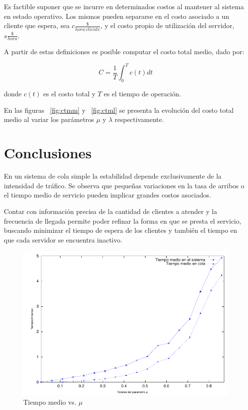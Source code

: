 \documentclass{sig-alternate}
\begin{document}
Es factible suponer que se incurre en determinados costos al mantener al
sistema en estado operativo. Los mismos pueden separarse en el costo
asociado a un cliente que espera, sea $c\frac{\$}{hora\ cliente}$, y el costo
propio de utilizaci\'{o}n del servidor, $s\frac{\$}{hora}$.


A partir de estas definiciones es posible computar el costo total medio, dado 
por:

\begin{equation}
\label{costo_total_medio}
C = \frac{1}{T} \int_{0}^{T} c(t) dt
\end{equation}

donde $c(t)$ es el costo total y $T$ es el tiempo de operaci\'{o}n.

En las figuras ~\ref{fig:ctmm} y ~\ref{fig:ctml} se presenta la evoluci\'{o}n
del costo total medio
al variar los par\'{a}metros $\mu$ y $\lambda$ respectivamente.


\section{Conclusiones}\label{conclusiones}

En un sistema de cola simple la estabilidad depende exclusivamente de la
intensidad de tr\'{a}fico. Se observa que peque\~{n}as variaciones en la tasa
de arribos o el tiempo medio de servicio pueden implicar grandes costos 
asociados.


Contar con informaci\'{o}n precisa de la cantidad de clientes a atender y la
frecuencia de llegada permite poder refinar la forma en que se presta el servicio,
buscando minimizar el tiempo de espera de los clientes y tambi\'{e}n el tiempo
en que cada servidor se encuentra inactivo.


\begin{figure}[hp]
\centering
\includegraphics[scale=0.8]{graficos/tMediomu}
\caption{Tiempo medio vs. $\mu$}
\label{fig:mu}
\end{figure}
\end{document}
